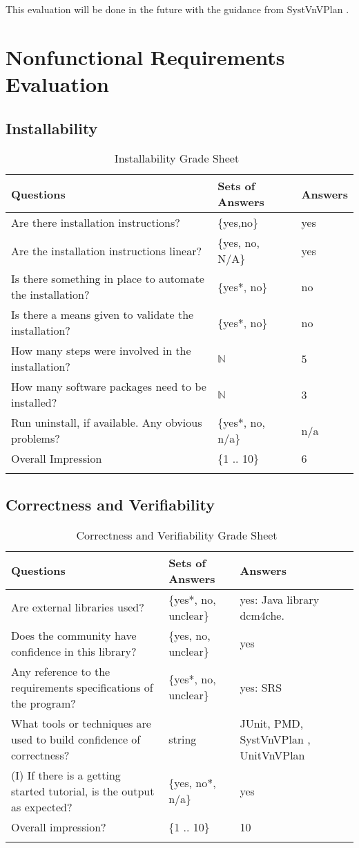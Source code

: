 \documentclass[12pt, titlepage]{article}
\begin{document}
This evaluation will be done in the future with the guidance from SystVnVPlan
\cite{Dong2019SystVnV}.

\section{Nonfunctional Requirements Evaluation}

\subsection{Installability}
\label{sec_Installability}

\begin{longtable}{p{10cm} l l}
\toprule
Questions & Sets of Answers & Answers\\ \midrule
Are there installation instructions? & \{yes,no\} & yes\\
Are the installation instructions linear? & \{yes, no, N/A\} & yes\\
Is there something in place to automate the installation? & \{yes*, no\} & no\\
Is there a means given to validate the installation? & \{yes*, no\} & no\\
How many steps were involved in the installation? & $\mathbb{N}$ & 5\\
How many software packages need to be installed? & $\mathbb{N}$ & 3\\
Run uninstall, if available. Any obvious problems? & \{yes*, no, n/a\} & n/a\\
Overall Impression & \{1 .. 10\} & 6\\
\bottomrule
\caption{Installability Grade Sheet~\cite{SmithEtAl2018}}
\label{Tb_installability}
\end{longtable}

\subsection{Correctness and Verifiability}
\label{sec_CorrectnessVerifiability}

\begin{longtable}{p{8cm} l p{5cm}}
\toprule
Questions & Sets of Answers & Answers\\ \midrule
Are external libraries used? & \{yes*, no, unclear\} & yes: Java library
dcm4che.\\
Does the community have confidence in this library? & \{yes, no, unclear\} &
yes\\
Any reference to the requirements specifications of the program? & \{yes*, no,
unclear\} & yes: SRS \cite{Dong2019SRS}\\
What tools or techniques are used to build confidence of correctness? & string
&JUnit, PMD, SystVnVPlan \cite{Dong2019SystVnV}, UnitVnVPlan
\cite{Dong2019UnitVnV}
\\
(I) If there is a getting started tutorial, is the output as expected? & \{yes,
no*, n/a\} & yes\\
Overall impression? & \{1 .. 10\} & 10\\
\bottomrule
\caption{Correctness and Verifiability Grade Sheet~\cite{SmithEtAl2018}}
\label{Tb_correctnessVerifiability}
\end{longtable}
\end{document}
